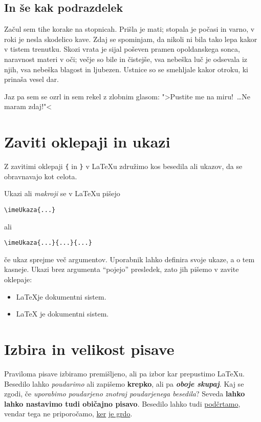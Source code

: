 \documentclass[a4paper]{article}
\begin{document}
\subsection{In še kak podrazdelek}

Začul sem tihe korake na stopnicah. Prišla je mati; stopala je počasi in varno, v roki je
nesla skodelico kave. Zdaj se spominjam, da nikoli ni bila tako lepa kakor v tistem
trenutku. Skozi vrata je sijal poševen pramen opoldanskega sonca, naravnost materi v oči;
večje so bile in čistejše, vsa nebeška luč je odsevala iz njih, vsa nebeška blagost in
ljubezen. Ustnice so se smehljale kakor otroku, ki prinaša vesel dar.

Jaz pa sem se ozrl in sem rekel z zlobnim glasom: ">Pustite me na miru!~\dots Ne maram zdaj!"<

\section{Zaviti oklepaji in ukazi}

Z zavitimi oklepaji \texttt{\{} in \texttt{\}} v LaTeXu združimo kos besedila ali ukazov,
da se obravnavajo kot celota.

Ukazi ali \emph{makroji} se v LaTeXu pišejo
%
\begin{center}
  \verb|\imeUkaza{...}|
\end{center}
%
ali
%
\begin{center}
  \verb|\imeUkaza{...}{...}{...}|
\end{center}
%
če ukaz sprejme več argumentov. Uporabnik lahko definira svoje ukaze, a o tem kasneje.
Ukazi brez argumenta ``pojejo'' presledek, zato jih pišemo v zavite oklepaje:
%
\begin{itemize}
\item \LaTeX je dokumentni sistem.
\item {\LaTeX} je dokumentni sistem.
\end{itemize}


\section{Izbira in velikost pisave}

Praviloma pisave izbiramo premišljeno, ali pa izbor kar prepustimo LaTeXu.
Besedilo lahko \emph{poudarimo} ali zapišemo \textbf{krepko}, ali pa \emph{\textbf{oboje skupaj}}.
Kaj se zgodi, če \emph{uporabimo poudarjeno \emph{znotraj} poudarjenega besedila}?
Seveda \textbf{lahko lahko nastavimo tudi \textnormal{običajno} pisavo}.
Besedilo lahko tudi \underline{podčrtamo}, vendar tega ne priporočamo, \underline{ker} \underline{je grdo}.
\end{document}
